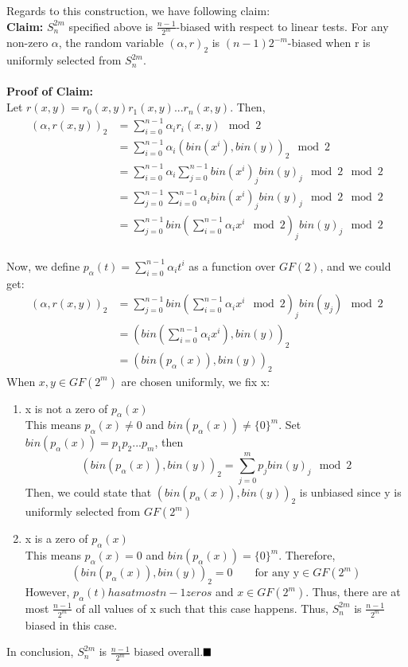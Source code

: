 \documentclass[a4paper, english]{paper}
\begin{document}
 Regards to this construction, we have following claim:\\
\noindent\textbf{Claim:} $S^{2m}_n$ specified above is $\frac{n-1}{2^m}$-biased with respect to linear tests. For any non-zero $\alpha$, the random variable $(\alpha,r)_2$ is $(n-1)2^{-m}$-biased when r is uniformly selected from $S^{2m}_n$.\\\\
\noindent\textbf{Proof of Claim:}\\
Let $r(x,y)=r_0(x,y)r_1(x,y)...r_n(x,y)$. Then, 
\begin{align*}
(\alpha,r(x,y))_2 &= \sum_{i=0}^{n-1}\alpha_ir_i(x,y) \mod 2\\
&= \sum_{i=0}^{n-1}\alpha_i(bin(x^i),bin(y))_2 \mod 2\\
&= \sum_{i=0}^{n-1}\alpha_i \sum_{j=0}^{n-1}bin(x^i)_jbin(y)_j \mod2 \mod 2\\
&= \sum_{j=0}^{n-1}\sum_{i=0}^{n-1}\alpha_i bin(x^i)_jbin(y)_j \mod2 \mod 2\\
&= \sum_{j=0}^{n-1}bin\left(\sum_{i=0}^{n-1}\alpha_i x^i \mod2 \right)_jbin(y)_j \mod 2\\
\end{align*}\par
Now, we define $p_\alpha(t) = \sum_{i=0}^{n-1}\alpha_i t^i$ as a function over $GF(2)$, and we could get:
\begin{align*}
(\alpha,r(x,y))_2 
&= \sum_{j=0}^{n-1}bin\left(\sum_{i=0}^{n-1}\alpha_i x^i \mod2 \right)_jbin(y_j) \mod 2\\
&= (bin(\sum_{i=0}^{n-1}\alpha_i x^i),bin(y))_2\\
&= (bin(p_\alpha(x)), bin(y))_2
\end{align*}
When $x,y\in GF(2^m)$ are chosen uniformly, we fix x:
\begin{enumerate}
\item x is not a zero of $p_\alpha(x)$\\
This means $p_\alpha(x)\ne 0$ and $bin(p_\alpha(x))\ne\{0\}^m$. Set $bin(p_\alpha(x))=p_1p_2...p_{m}$, then 
$$(bin(p_\alpha(x)), bin(y))_2 = \sum_{j=0}^m p_jbin(y)_j \mod 2$$
Then, we could state that $(bin(p_\alpha(x)), bin(y))_2$ is unbiased since y is uniformly selected from $GF(2^m)$
\item x is a zero of $p_\alpha(x)$\\
This means $p_\alpha(x)= 0$ and $bin(p_\alpha(x))=\{0\}^m$. Therefore,$$(bin(p_\alpha(x)), bin(y))_2 = 0 \qquad\text{for any y}\in GF(2^m)$$
However, $p_\alpha(t)has at most n-1 zeros$ and $x\in GF(2^m)$. Thus, there are at most $\frac{n-1}{2^m}$ of all values of x such that this case happens. Thus, $S^{2m}_n$ is $\frac{n-1}{2^m}$ biased in this case.
\end{enumerate}\par
In conclusion, $S^{2m}_n$ is $\frac{n-1}{2^m}$ biased overall.$\hfill\blacksquare$ \\
\end{document}
